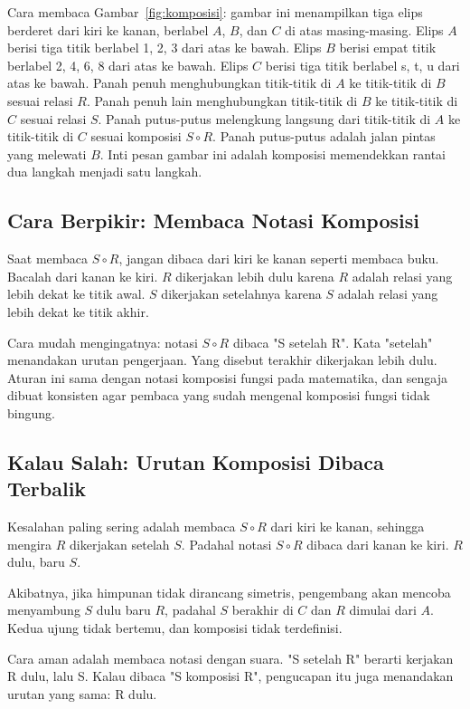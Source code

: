 \documentclass[11pt,a4paper]{article}
\begin{document}
Cara membaca Gambar~\ref{fig:komposisi}: gambar ini menampilkan tiga elips berderet dari kiri ke kanan, berlabel $A$, $B$, dan $C$ di atas masing-masing. Elips $A$ berisi tiga titik berlabel 1, 2, 3 dari atas ke bawah. Elips $B$ berisi empat titik berlabel 2, 4, 6, 8 dari atas ke bawah. Elips $C$ berisi tiga titik berlabel s, t, u dari atas ke bawah. Panah penuh menghubungkan titik-titik di $A$ ke titik-titik di $B$ sesuai relasi $R$. Panah penuh lain menghubungkan titik-titik di $B$ ke titik-titik di $C$ sesuai relasi $S$. Panah putus-putus melengkung langsung dari titik-titik di $A$ ke titik-titik di $C$ sesuai komposisi $S \circ R$. Panah putus-putus adalah jalan pintas yang melewati $B$. Inti pesan gambar ini adalah komposisi memendekkan rantai dua langkah menjadi satu langkah.

\subsection{Cara Berpikir: Membaca Notasi Komposisi}

Saat membaca $S \circ R$, jangan dibaca dari kiri ke kanan seperti membaca buku. Bacalah dari kanan ke kiri. $R$ dikerjakan lebih dulu karena $R$ adalah relasi yang lebih dekat ke titik awal. $S$ dikerjakan setelahnya karena $S$ adalah relasi yang lebih dekat ke titik akhir.

Cara mudah mengingatnya: notasi $S \circ R$ dibaca "S setelah R". Kata "setelah" menandakan urutan pengerjaan. Yang disebut terakhir dikerjakan lebih dulu. Aturan ini sama dengan notasi komposisi fungsi pada matematika, dan sengaja dibuat konsisten agar pembaca yang sudah mengenal komposisi fungsi tidak bingung.

\subsection{Kalau Salah: Urutan Komposisi Dibaca Terbalik}

Kesalahan paling sering adalah membaca $S \circ R$ dari kiri ke kanan, sehingga mengira $R$ dikerjakan setelah $S$. Padahal notasi $S \circ R$ dibaca dari kanan ke kiri. $R$ dulu, baru $S$.

Akibatnya, jika himpunan tidak dirancang simetris, pengembang akan mencoba menyambung $S$ dulu baru $R$, padahal $S$ berakhir di $C$ dan $R$ dimulai dari $A$. Kedua ujung tidak bertemu, dan komposisi tidak terdefinisi.

Cara aman adalah membaca notasi dengan suara. "S setelah R" berarti kerjakan R dulu, lalu S. Kalau dibaca "S komposisi R", pengucapan itu juga menandakan urutan yang sama: R dulu.
\end{document}
